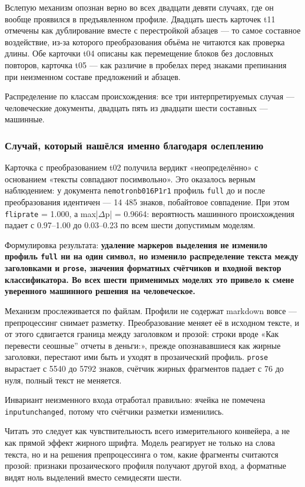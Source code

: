 \documentclass[11pt,a4paper]{article}
\renewcommand{\_}{\textunderscore\allowbreak}
\begin{document}
Вслепую механизм опознан верно во всех двадцати девяти случаях, где он вообще
проявился в предъявленном профиле. Двадцать шесть карточек t11 отмечены как
дублирование вместе с перестройкой абзацев — то самое составное воздействие,
из-за которого преобразования объёма не читаются как проверка длины. Обе карточки
t04 описаны как перемещение блоков без дословных повторов, карточка t05 — как
различие в пробелах перед знаками препинания при неизменном составе предложений и
абзацев.

Распределение по классам происхождения: все три интерпретируемых случая —
человеческие документы, двадцать пять из двадцати шести составных — машинные.

\subsubsection{Случай, который нашёлся именно благодаря ослеплению}

Карточка с преобразованием t02 получила вердикт «неопределённо» с основанием
«тексты совпадают посимвольно». Это оказалось верным наблюдением: у документа
\texttt{nemotron\_b016\_P1\_r1} профиль \texttt{full} до и после преобразования идентичен —
14 485 знаков, побайтовое совпадение. При этом \texttt{flip\_rate} = 1.000, а
max|$\Delta$p| = 0.9664: вероятность машинного происхождения падает с 0.97–1.00 до
0.03–0.23 по всем шести допустимым моделям.

Формулировка результата: \textbf{удаление маркеров выделения не изменило профиль \texttt{full}
ни на один символ, но изменило распределение текста между заголовками и \texttt{prose},
значения форматных счётчиков и входной вектор классификатора. Во всех шести
применимых моделях это привело к смене уверенного машинного решения на
человеческое.}

Механизм прослеживается по файлам. Профили не содержат markdown вовсе —
препроцессинг снимает разметку. Преобразование меняет её в исходном тексте, и от
этого сдвигается граница между заголовком и прозой: строки вроде «Как перевести
\quotedblbase{}сеошные'' отчеты в деньги:», прежде опознававшиеся как жирные заголовки,
перестают ими быть и уходят в прозаический профиль. \texttt{prose} вырастает с 5540 до
5792 знаков, счётчик жирных фрагментов падает с 76 до нуля, полный текст не
меняется.

Инвариант неизменного входа отработал правильно: ячейка не помечена
\texttt{input\_unchanged}, потому что счётчики разметки изменились.

Читать это следует как чувствительность всего измерительного конвейера, а не как
прямой эффект жирного шрифта. Модель реагирует не только на слова текста, но и на
решения препроцессинга о том, какие фрагменты считаются прозой: признаки
прозаического профиля получают другой вход, а форматные видят ноль выделений
вместо семидесяти шести.
\end{document}
